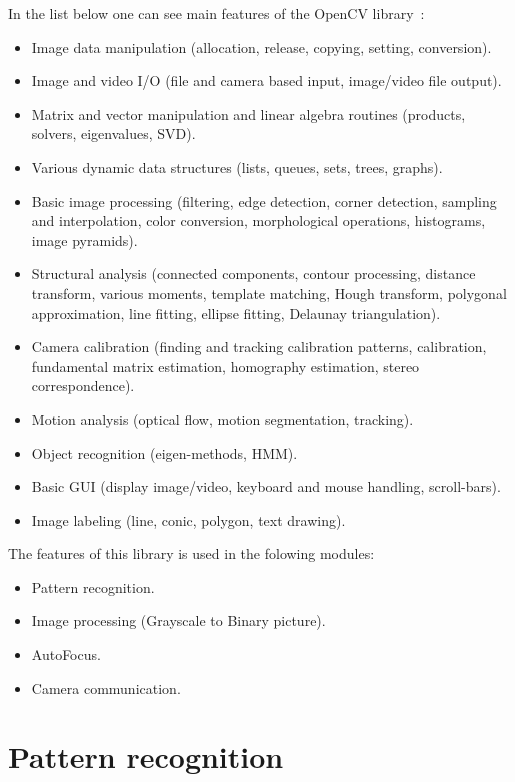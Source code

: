 In the list below one can see main features of the OpenCV library~\cite{Reference4}:
\begin{itemize}
\setlength\itemsep{-0.5em}
\item Image data manipulation (allocation, release, copying, setting, conversion).
\item Image and video I/O (file and camera based input, image/video file output).
\item Matrix and vector manipulation and linear algebra routines (products, solvers, eigenvalues, SVD).
\item Various dynamic data structures (lists, queues, sets, trees, graphs).
\item Basic image processing (filtering, edge detection, corner detection, sampling and interpolation, color conversion, morphological operations, histograms, image pyramids).
\item Structural analysis (connected components, contour processing, distance transform, various moments, template matching, Hough transform, polygonal approximation, line fitting, ellipse fitting, Delaunay triangulation).
\item Camera calibration (finding and tracking calibration patterns, calibration, fundamental matrix estimation, homography estimation, stereo correspondence).
\item Motion analysis (optical flow, motion segmentation, tracking).
\item Object recognition (eigen-methods, HMM).
\item Basic GUI (display image/video, keyboard and mouse handling, scroll-bars).
\item Image labeling (line, conic, polygon, text drawing).
\end{itemize}

The features of this library is used in the folowing modules:
\begin{itemize}
\setlength\itemsep{-0.5em}
\item Pattern recognition.
\item Image processing (Grayscale to Binary picture).
\item AutoFocus.
\item Camera communication.
\end{itemize}

\section{Pattern recognition}

